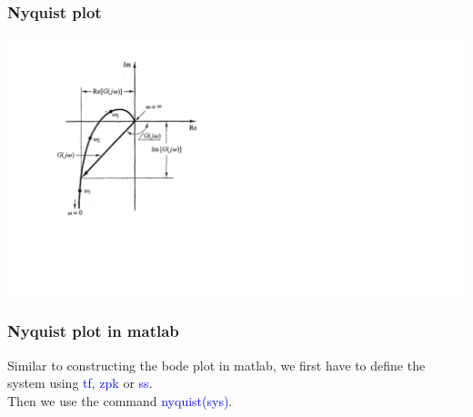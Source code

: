 \begin{frame}
\frametitle{Nyquist plot}


\includegraphics[scale=0.5]{NyquistPlot}



\end{frame}

\begin{frame}
\frametitle{Nyquist plot in matlab}
Similar to constructing the bode plot in matlab, we first have to define the system using \textcolor{blue}{tf}, \textcolor{blue}{zpk} or \textcolor{blue}{ss}.\\
Then we use the command \textcolor{blue}{nyquist(sys)}.


\end{frame}

